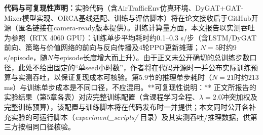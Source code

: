 \documentclass[12pt,a4paper,UTF8]{ctexart}
\begin{document}
\textbf{代码与可复现性声明：}实验代码（含AirTrafficEnv仿真环境、DyGAT+GAT-Mixer模型实现、ORCA基线适配、训练与评估脚本）将在论文接收后于GitHub开源（匿名链接在camera-ready版本提供）。训练计算量方面，本文报告以实测吞吐为参照（RTX 4060 GPU）：训练单步平均耗时约0.1--0.3 s/步（含LSTM/DyGAT前向、策略与价值网络的前向与反向传播及4轮PPO更新摊薄；$N=5$时约9 s/episode，随$N$与episode长度增大而上升）。由于正文未公开确切的总训练步数口径，此处不给出固定的“单seed小时数”，作者将在代码开源时一并公布实际训练预算与实测吞吐，以保证复现成本可核验。第5.9节的推理单步耗时（$N=21$时约213 ms）与训练单步成本是不同口径，不应混用。**可复现性说明：** 正文所报告的实验结果（第5章各表）对应完整训练配置（含课程学习全程、$\lambda=2.0$冲突加权及完整训练预算），该配置与训练脚本将在代码发布时一并提供；本文同时公开各补充实验的可运行脚本（\textit{experiment\_scripts/} 目录）及其实测吞吐/推理数据，供第三方按相同口径核验。
\end{document}
